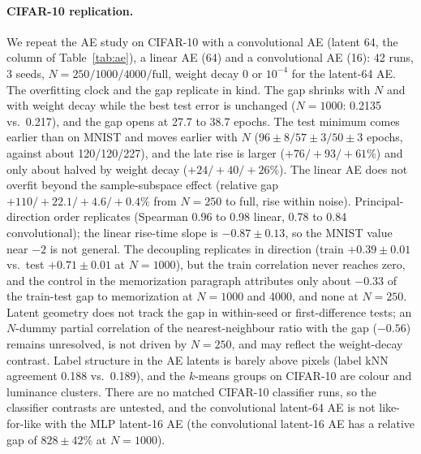\documentclass[10pt]{article}
\begin{document}
\paragraph{CIFAR-10 replication.} We repeat the AE study on CIFAR-10 with a convolutional AE (latent 64, the column of Table~\ref{tab:ae}), a linear AE (64) and a convolutional AE (16): 42 runs, 3 seeds, $N=250/1000/4000/\text{full}$, weight decay 0 or $10^{-4}$ for the latent-64 AE. The overfitting clock and the gap replicate in kind. The gap shrinks with $N$ and with weight decay while the best test error is unchanged ($N=1000$: 0.2135 vs.\ 0.217), and the gap opens at 27.7 to 38.7 epochs. The test minimum comes earlier than on MNIST and moves earlier with $N$ ($96\pm8/57\pm3/50\pm3$ epochs, against about 120/120/227), and the late rise is larger ($+76/+93/+61\%$) and only about halved by weight decay ($+24/+40/+26\%$). The linear AE does not overfit beyond the sample-subspace effect (relative gap $+110/+22.1/+4.6/+0.4\%$ from $N=250$ to full, rise within noise). Principal-direction order replicates (Spearman 0.96 to 0.98 linear, 0.78 to 0.84 convolutional); the linear rise-time slope is $-0.87\pm0.13$, so the MNIST value near $-2$ is not general. The decoupling replicates in direction (train $+0.39\pm0.01$ vs.\ test $+0.71\pm0.01$ at $N=1000$), but the train correlation never reaches zero, and the control in the memorization paragraph attributes only about $-0.33$ of the train-test gap to memorization at $N=1000$ and 4000, and none at $N=250$. Latent geometry does not track the gap in within-seed or first-difference tests; an $N$-dummy partial correlation of the nearest-neighbour ratio with the gap ($-0.56$) remains unresolved, is not driven by $N=250$, and may reflect the weight-decay contrast. Label structure in the AE latents is barely above pixels (label kNN agreement 0.188 vs.\ 0.189), and the $k$-means groups on CIFAR-10 are colour and luminance clusters. There are no matched CIFAR-10 classifier runs, so the classifier contrasts are untested, and the convolutional latent-64 AE is not like-for-like with the MLP latent-16 AE (the convolutional latent-16 AE has a relative gap of $828\pm42\%$ at $N=1000$).
\end{document}

